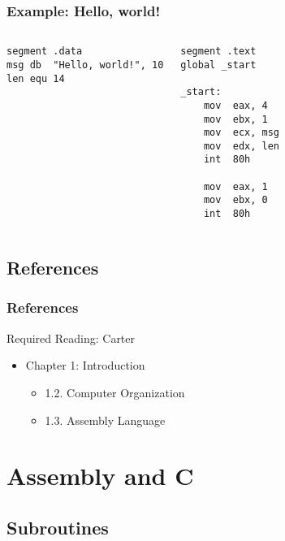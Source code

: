 \documentclass[dvipsnames]{beamer}
\begin{document}
\begin{frame}[fragile]
  \frametitle{Example: Hello, world!}

    \begin{columns}[t]
      \begin{lstlisting}
segment .data
msg db  "Hello, world!", 10
len equ 14
      \end{lstlisting}

      \begin{lstlisting}
segment .text
global _start

_start:
    mov  eax, 4
    mov  ebx, 1
    mov  ecx, msg
    mov  edx, len
    int  80h

    mov  eax, 1
    mov  ebx, 0
    int  80h
      \end{lstlisting}
    \end{columns}
\end{frame}

\subsection*{References}

\begin{frame}
  \frametitle{References}

  \begin{block}{Required Reading: Carter}
    \begin{itemize}
      \item Chapter 1: Introduction
      \begin{itemize}
        \item 1.2. \alert{Computer Organization}
        \item 1.3. \alert{Assembly Language}
      \end{itemize}
    \end{itemize}
  \end{block}
\end{frame}

\section{Assembly and C}

\subsection{Subroutines}
\end{document}
